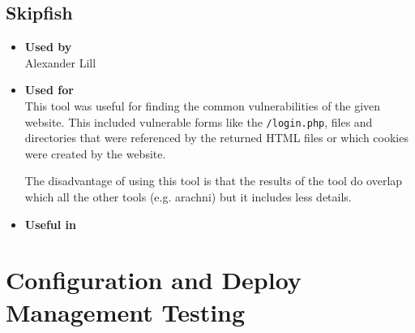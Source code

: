 \subsection*{Skipfish}
\begin{itemize}
	\item \textbf{Used by}\\ Alexander Lill
	\item \textbf{Used for}\\ This tool was useful for finding the common vulnerabilities of the given website. This included vulnerable forms like the \texttt{/login.php}, files and directories that were referenced by the returned HTML files or which cookies were created by the website.
	
	The disadvantage of using this tool is that the results of the tool do overlap which all the other tools (e.g. arachni) but it includes less details.
	\item \textbf{Useful in}\\ 
\end{itemize}


\clearpage
\section{Configuration and Deploy Management Testing}

